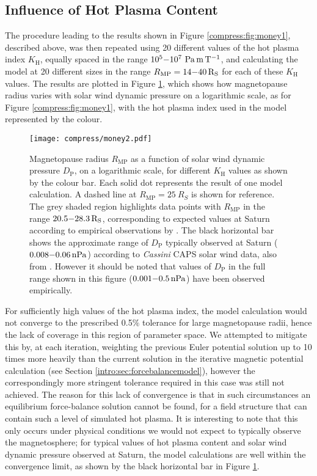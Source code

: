 \subsection{Influence of Hot Plasma Content} \label{compress:sec:hotplasma}
The procedure leading to the results shown in Figure \ref{compress:fig:money1}, described above, was then repeated using 20 different values of the hot plasma index $K_\mathrm{H}$, equally spaced in the range $10^5 {\--} 10^7~\si{\pascal\meter\per\tesla}$, and calculating the model at 20 different sizes in the range $R_\mathrm{MP} = 14{\--}\SI{40}{R_S}$ for each of these $K_\mathrm{H}$ values. The results are plotted in Figure \ref{compress:fig:money2}, which shows how magnetopause radius varies with solar wind dynamic pressure on a logarithmic scale, as for Figure \ref{compress:fig:money1}, with the hot plasma index used in the model represented by the colour.
\begin{figure}
\centering
\noindent\texttt{[image: compress/money2.pdf]}
\caption[Magnetopause radius versus solar wind dynamic pressure compressibility profiles for a range of $K_\mathrm{H}$.]{Magnetopause radius $R_\mathrm{MP}$ as a function of solar wind dynamic pressure $D_\mathrm{P}$, on a logarithmic scale, for different $K_\mathrm{H}$ values as shown by the colour bar. Each solid dot represents the result of one model calculation. A dashed line at $R_\mathrm{MP}{=}\SI{25}{R_S}$ is shown for reference. The grey shaded region highlights data points with $R_\mathrm{MP}$ in the range $20.5{\--}\SI{28.3}{R_S}$, corresponding to expected values at Saturn according to empirical observations by \citet{achilleos2008}. The black horizontal bar shows the approximate range of $D_\mathrm{P}$ typically observed at Saturn ($0.008 {\--} \SI{0.06}{nPa}$) according to \textit{Cassini} CAPS solar wind data, also from \citet{achilleos2008}. However it should be noted that values of $D_\mathrm{P}$ in the full range shown in this figure ($0.001 {\--} \SI{0.5}{nPa}$) have been observed empirically.} 
\label{compress:fig:money2}
\end{figure}
 
For sufficiently high values of the hot plasma index, the model calculation would not converge to the prescribed 0.5$\%$ tolerance for large magnetopause radii, hence the lack of coverage in this region of parameter space. We attempted to mitigate this by, at each iteration, weighting the previous Euler potential solution up to 10 times more heavily than the current solution in the iterative magnetic potential calculation (see Section \ref{intro:sec:forcebalancemodel}), however the correspondingly more stringent tolerance required in this case was still not achieved. The reason for this lack of convergence is that in such circumstances an equilibrium force-balance solution cannot be found, for a field structure that can contain such a level of simulated hot plasma. It is interesting to note that this only occurs under physical conditions we would not expect to typically observe the magnetosphere; for typical values of hot plasma content and solar wind dynamic pressure observed at Saturn, the model calculations are well within the convergence limit, as shown by the black horizontal bar in Figure \ref{compress:fig:money2}.

